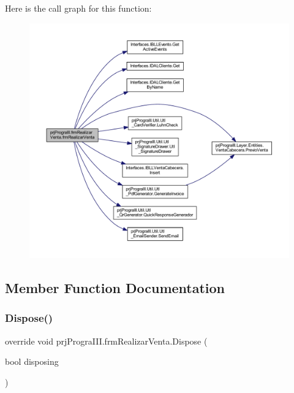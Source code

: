 Here is the call graph for this function\+:
\nopagebreak
\begin{figure}[H]
\begin{center}
\leavevmode
\includegraphics[width=350pt]{classprj_progra_i_i_i_1_1frm_realizar_venta_ad5950906776440d5a1b3a57fe4eba5a0_cgraph}
\end{center}
\end{figure}


\subsection{Member Function Documentation}
\hypertarget{classprj_progra_i_i_i_1_1frm_realizar_venta_a0d7ee36310182016d15cf55016db9468}{}\label{classprj_progra_i_i_i_1_1frm_realizar_venta_a0d7ee36310182016d15cf55016db9468} 
\subsubsection{\texorpdfstring{Dispose()}{Dispose()}}
{\footnotesize\ttfamily override void prj\+Progra\+I\+I\+I.\+frm\+Realizar\+Venta.\+Dispose (\begin{DoxyParamCaption}\item[{bool}]{disposing }\end{DoxyParamCaption})\hspace{0.3cm}{\ttfamily [protected]}}



